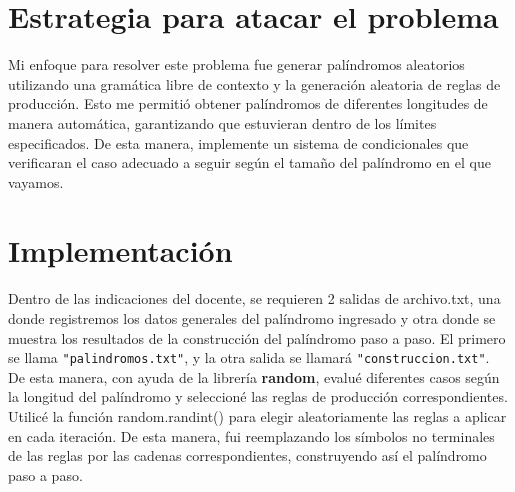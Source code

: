 \section{Estrategia para atacar el problema}
Mi enfoque para resolver este problema fue generar palíndromos aleatorios utilizando una gramática libre de contexto y la generación aleatoria de reglas de producción. Esto me permitió obtener palíndromos de diferentes longitudes de manera automática, garantizando que estuvieran dentro de los límites especificados. De esta manera, implemente un sistema de condicionales que verificaran el caso adecuado a seguir según el tamaño del palíndromo en el que vayamos.\newline
\\
\section{Implementación} 
Dentro de las indicaciones del docente, se requieren 2 salidas de archivo.txt, una donde
registremos los datos generales del palíndromo ingresado y otra donde se muestra los resultados de la construcción del palíndromo paso a paso. El primero se llama \verb|"palindromos.txt"|, y la otra salida se llamará \verb|"construccion.txt"|.\newline
\\
De esta manera, con ayuda de la librería 
\textbf{random}, evalué diferentes casos según la longitud del palíndromo y seleccioné las reglas de producción correspondientes. Utilicé la función random.randint() para elegir aleatoriamente las reglas a aplicar en cada iteración. De esta manera, fui reemplazando los símbolos no terminales de las reglas por las cadenas correspondientes, construyendo así el palíndromo paso a paso.\newline
\\

